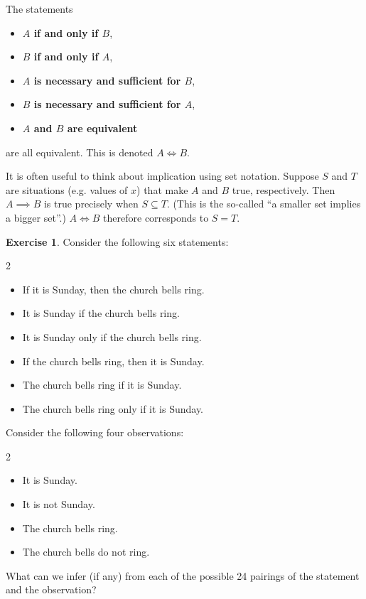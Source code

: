 \documentclass[11pt]{article}
\theoremstyle{definition}
\newtheorem{example}[theorem]{Exercise}
\theoremstyle{remark}
\begin{document}
The statements
\begin{itemize}
    \item \textbf{\(A\) if and only if \(B\)},
    \item \textbf{\(B\) if and only if \(A\)},
    \item \textbf{\(A\) is necessary and sufficient for \(B\)},
    \item \textbf{\(B\) is necessary and sufficient for \(A\)},
    \item \textbf{\(A\) and \(B\) are equivalent}
\end{itemize}
are all equivalent. This is denoted \(A \iff B\).

It is often useful to think about implication using set notation. Suppose \(S\) and \(T\) are situations (e.g. values of \(x\)) that make \(A\) and \(B\) true, respectively. Then \(A \implies B\) is true precisely when \(S \subseteq T\). (This is the so-called ``a smaller set implies a bigger set''.) \(A \iff B\) therefore corresponds to \(S = T\).

\begin{example}\label{tmua-6-unit-006}
    Consider the following six statements:
    \begin{multicols}{2}
        \begin{itemize}
            \item If it is Sunday, then the church bells ring.
            \item It is Sunday if the church bells ring.
            \item It is Sunday only if the church bells ring.
            \item If the church bells ring, then it is Sunday.
            \item The church bells ring if it is Sunday.
            \item The church bells ring only if it is Sunday.
        \end{itemize} 
    \end{multicols}

    Consider the following four observations:
    \begin{multicols}{2}
        \begin{itemize}
            \item It is Sunday.
            \item It is not Sunday.
            \item The church bells ring.
            \item The church bells do not ring.
        \end{itemize}
    \end{multicols}
    

    What can we infer (if any) from each of the possible 24 pairings of the statement and the observation?
\end{example}
\end{document}

